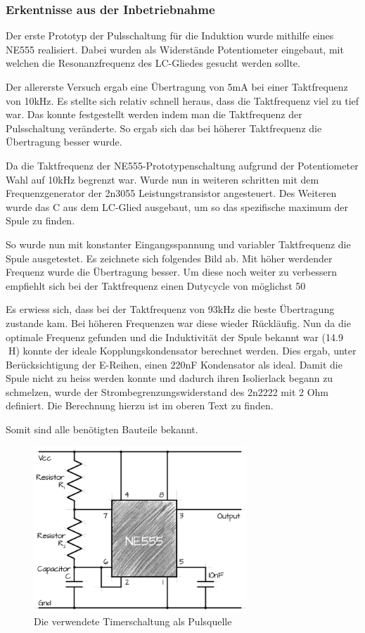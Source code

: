 \subsubsection*{Erkentnisse aus der Inbetriebnahme}\label{sec:energieuebertragung}

Der erste Prototyp der Pulsschaltung für die Induktion wurde mithilfe eines NE555 realisiert. Dabei wurden als Widerstände Potentiometer eingebaut, mit welchen die Resonanzfrequenz des LC-Gliedes gesucht werden sollte.

Der allererste Versuch ergab eine Übertragung von 5mA bei einer Taktfrequenz von 10kHz. Es stellte sich relativ schnell heraus, dass die Taktfrequenz viel zu tief war. Das konnte festgestellt werden indem man die Taktfrequenz der Pulsschaltung veränderte. So ergab sich das bei höherer Taktfrequenz die Übertragung besser wurde.

Da die Taktfrequenz der NE555-Prototypenschaltung aufgrund der Potentiometer Wahl auf 10kHz begrenzt war. Wurde nun in weiteren schritten mit dem Frequenzgenerator der 2n3055 Leistungstransistor angesteuert. Des Weiteren wurde das C aus dem LC-Glied ausgebaut, um so das spezifische maximum der Spule zu finden.

So wurde nun mit konstanter Eingangsspannung und variabler Taktfrequenz die Spule ausgetestet. Es zeichnete sich folgendes Bild ab. Mit höher werdender Frequenz wurde die Übertragung besser. Um diese noch weiter zu verbessern empfiehlt sich bei der Taktfrequenz einen Dutycycle von möglichst 50%

Es erwiess sich, dass bei der Taktfrequenz von 93kHz die beste Übertragung zustande kam. Bei höheren Frequenzen war diese wieder Rückläufig. Nun da die optimale Frequenz gefunden und die Induktivität der Spule bekannt war (14.9 H) konnte der ideale Kopplungskondensator berechnet werden. Dies ergab, unter Berücksichtigung der E-Reihen, einen 220nF Kondensator als ideal. Damit die Spule nicht zu heiss werden konnte und dadurch ihren Isolierlack begann zu schmelzen, wurde der Strombegrenzungswiderstand des 2n2222 mit 2 Ohm definiert. Die Berechnung hierzu ist im oberen Text zu finden.

Somit sind alle benötigten Bauteile bekannt.

\begin{figure}[H]
	\begin{center}
		\includegraphics[width=80mm]{data/Ne555circuit.png}
		\caption[Ne555]{Die verwendete Timerschaltung als Pulsquelle} %
		\label{fig:Prototyp Down}
	\end{center}
\end{figure}

